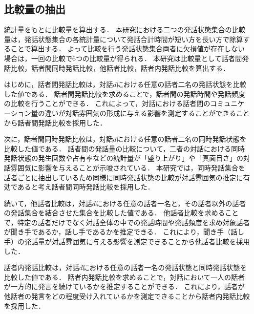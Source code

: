 \subsection{比較量の抽出}

統計量をもとに比較量を算出する．
本研究における二つの発話状態集合の比較量は，発話状態集合の各統計量について発話合計時間が短い方を長い方で除算することで算出する．
よって比較を行う発話状態集合両者に欠損値が存在しない場合は，一回の比較で6つの比較量が得られる．
本研究は比較量として話者間発話比較，話者間同時発話比較，他話者比較，話者内発話比較を算出する．

はじめに，話者間発話比較は，対話$d$における任意の話者二名の発話状態を比較した値である．
話者間発話比較を求めることで，話者間の発話時間や発話頻度の比較を行うことができる．
これによって，対話における話者間のコミュニケーション量の違いが対話雰囲気の形成に与える影響を測定することができることから話者間発話比較を採用した．

次に，話者間同時発話比較は，対話$d$における任意の話者二名の同時発話状態を比較した値である．
話者間の発話量の比較について，二者の対話における同時発話状態の発生回数や占有率などの統計量が「盛り上がり」や「真面目さ」の対話雰囲気に影響を与えることが示唆されている\cite{Ito}\cite{Toyota}．
本研究では，同時発話集合を話者ごとに抽出しているため同様に同時発話状態の比較が対話雰囲気の推定に有効であると考え話者間同時発話比較を採用した．

続いて，他話者比較は，対話$d$における任意の話者一名と，その話者以外の話者の発話集合を結合させた集合を比較した値である．
他話者比較を求めることで，特定の話者だけでなく対話全体の中での発話時間や発話頻度を求め対象話者が聞き手であるか，話し手であるかを推定できる．
これにより，聞き手（話し手）の発話量が対話雰囲気に与える影響を測定できることから他話者比較を採用した．

話者内発話比較は，対話$d$における任意の話者一名の発話状態と同時発話状態を比較した値である．
話者内発話比較を求めることで，対話において一人の話者が一方的に発言を続けているかを推定することができる．
これにより，話者が他話者の発言をどの程度受け入れているかを測定できることから話者内発話比較を採用した．

